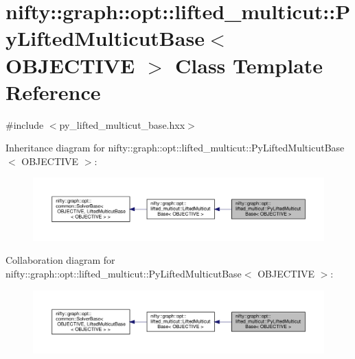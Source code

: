 \hypertarget{classnifty_1_1graph_1_1opt_1_1lifted__multicut_1_1PyLiftedMulticutBase}{}\section{nifty\+:\+:graph\+:\+:opt\+:\+:lifted\+\_\+multicut\+:\+:Py\+Lifted\+Multicut\+Base$<$ O\+B\+J\+E\+C\+T\+I\+VE $>$ Class Template Reference}
\label{classnifty_1_1graph_1_1opt_1_1lifted__multicut_1_1PyLiftedMulticutBase}


{\ttfamily \#include $<$py\+\_\+lifted\+\_\+multicut\+\_\+base.\+hxx$>$}



Inheritance diagram for nifty\+:\+:graph\+:\+:opt\+:\+:lifted\+\_\+multicut\+:\+:Py\+Lifted\+Multicut\+Base$<$ O\+B\+J\+E\+C\+T\+I\+VE $>$\+:
\nopagebreak
\begin{figure}[H]
\begin{center}
\leavevmode
\includegraphics[width=350pt]{classnifty_1_1graph_1_1opt_1_1lifted__multicut_1_1PyLiftedMulticutBase__inherit__graph}
\end{center}
\end{figure}


Collaboration diagram for nifty\+:\+:graph\+:\+:opt\+:\+:lifted\+\_\+multicut\+:\+:Py\+Lifted\+Multicut\+Base$<$ O\+B\+J\+E\+C\+T\+I\+VE $>$\+:
\nopagebreak
\begin{figure}[H]
\begin{center}
\leavevmode
\includegraphics[width=350pt]{classnifty_1_1graph_1_1opt_1_1lifted__multicut_1_1PyLiftedMulticutBase__coll__graph}
\end{center}
\end{figure}
